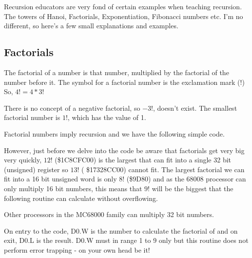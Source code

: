 Recursion educators are very fond of certain examples when teaching
    recursion. The towers of Hanoi, Factorials, Exponentiation, Fibonacci
    numbers etc. I'm no different, so here's a few small explanations and
    examples.

\subsection{Factorials}
\label{ch13-factorials}%

The factorial of a number is that number, multiplied by the
      factorial of the number before it. The symbol for a factorial number is the exclamation mark (!)  So, $4! = 4 * 3!$
      
      There is no concept of a negative factorial, so $-3!$, doesn't
      exist. The smallest factorial number is $1!$, which has the value of 1.

Factorial numbers imply recursion and we have the following simple
      code.

However, just before we delve into the code be aware that factorials get
      very big very quickly, $12!$ (\$1C8CFC00) is the largest that can fit into
      a single 32 bit (unsigned) register so $13!$ ( \$17328CC00) cannot fit.
      The largest factorial we can fit into a 16 bit unsigned word is only $8!$
      (\$9D80) and as the 68008 processor can only multiply 16 bit numbers,
      this means that $9!$ will be the biggest that the following routine can
      calculate without overflowing.

\begin{note}
Other processors in the MC68000 family can multiply 32 bit
        numbers.
\end{note}

On entry to the code, D0.W is the number to calculate the
      factorial of and on exit, D0.L is the result. D0.W must in range 1 to 9
      only but this routine does not perform error trapping -{} on your own head
      be it!


